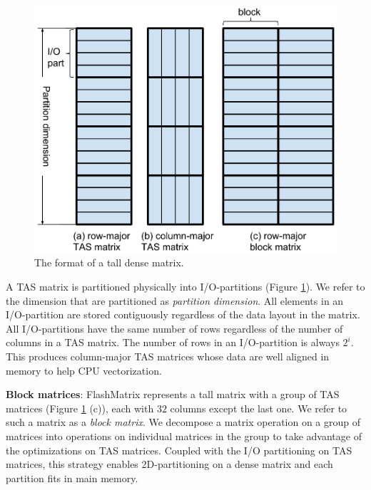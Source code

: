 \begin{figure}
	\centering
	\includegraphics[scale=0.5]{FlashMatrix_figs/dense_matrix2.pdf}
	\caption{The format of a tall dense matrix.}
	\label{fig:den_mat}
\end{figure}

A TAS matrix is partitioned physically into I/O-partitions (Figure
\ref{fig:den_mat}). We refer to the dimension that are partitioned as
\textit{partition dimension}. All elements in an I/O-partition are stored
contiguously regardless of the data layout in the matrix. All 
I/O-partitions have the same number of rows regardless of
the number of columns in a TAS matrix. The number of rows in
an I/O-partition is always $2^i$. This produces column-major TAS
matrices whose data are well aligned in memory to help CPU vectorization.

\noindent \textbf{Block matrices}:
FlashMatrix represents a tall matrix with a group of TAS matrices (Figure
\ref{fig:den_mat} (c)), each with $32$ columns except the last one. We refer
to such a matrix as a \textit{block matrix}. We decompose a matrix operation
on a group of matrices into operations on individual matrices in the group
to take advantage of the optimizations on TAS matrices.
Coupled with the I/O partitioning on TAS matrices, this strategy enables
2D-partitioning on a dense matrix and each partition fits in main memory.

